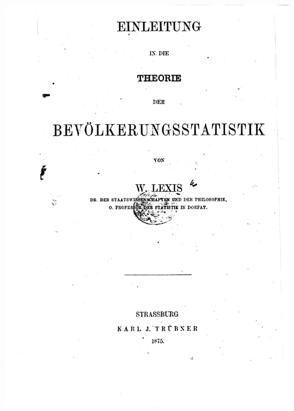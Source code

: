 \addtocounter{framenumber}{-1}
\begin{frame}[fragile]
  \begin{minipage}[t]{0.56\textwidth}
    \ \\[-2em]
    \hspace*{-1em}
    \includegraphics[width=0.95\textwidth,keepaspectratio]{Lexis-titlepage}
  \end{minipage}
  \begin{minipage}[t]{0.42\textwidth}
    \ \\[-3ex]

\end{minipage}
\end{frame}
